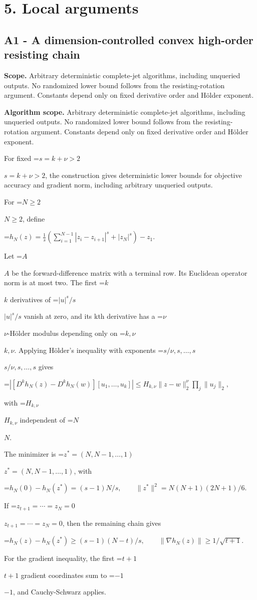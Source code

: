\documentclass[10pt,a4paper]{article}
\newcommand{\AtlasMath}[1]{\par\begingroup\centering\setbox0=\hbox{$\displaystyle #1$}\ifdim\wd0>1.4\linewidth\typeout{ATLAS WIDE FORMULA: \the\wd0}\fi\ifdim\wd0>\linewidth\resizebox{\linewidth}{!}{\box0}\else\box0\fi\par\endgroup}
\newcommand{\AtlasInlineMath}[1]{\begingroup\setbox0=\hbox{$#1$}\ifdim\wd0>.4\linewidth\endgroup\AtlasMath{#1}\else\endgroup$#1$\fi}
\begin{document}
\section{5. Local arguments}
\subsection{A1 - A dimension-controlled convex high-order resisting chain}
\textbf{Scope.} Arbitrary deterministic complete-jet algorithms, including unqueried outputs. No randomized lower bound follows from the resisting-rotation argument. Constants depend only on fixed derivative order and Hölder exponent.

\textbf{Algorithm scope.} Arbitrary deterministic complete-jet algorithms, including unqueried outputs. No randomized lower bound follows from the resisting-rotation argument. Constants depend only on fixed derivative order and Hölder exponent.

For fixed \AtlasInlineMath{s=k+\nu>2}, the construction gives deterministic lower bounds for objective accuracy and gradient norm, including arbitrary unqueried outputs.

For \AtlasInlineMath{N\ge2}, define

\AtlasMath{h_N(z)=\frac1s\left(\sum_{i=1}^{N-1}|z_i-z_{i+1}|^s+|z_N|^s\right)-z_1.}

Let \AtlasInlineMath{A} be the forward-difference matrix with a terminal row. Its Euclidean operator norm is at most two. The first \AtlasInlineMath{k} derivatives of \AtlasInlineMath{|u|^s/s} vanish at zero, and its kth derivative has a \AtlasInlineMath{\nu}-Hölder modulus depending only on \AtlasInlineMath{k,\nu}. Applying Hölder's inequality with exponents \AtlasInlineMath{s/\nu,s,\ldots,s} gives

\AtlasMath{|[D^kh_N(z)-D^kh_N(w)][u_1,\ldots,u_k]|
\le H_{k,\nu}\|z-w\|_2^\nu\prod_j\|u_j\|_2,}

with \AtlasInlineMath{H_{k,\nu}} independent of \AtlasInlineMath{N}.

The minimizer is \AtlasInlineMath{z^*=(N,N-1,\ldots,1)}, with

\AtlasMath{h_N(0)-h_N(z^*)=(s-1)N/s,\qquad
\|z^*\|^2=N(N+1)(2N+1)/6.}

If \AtlasInlineMath{z_{t+1}=\cdots=z_N=0}, then the remaining chain gives

\AtlasMath{h_N(z)-h_N(z^*)\ge(s-1)(N-t)/s,\qquad
\|\nabla h_N(z)\|\ge1/\sqrt{t+1}.}

For the gradient inequality, the first \AtlasInlineMath{t+1} gradient coordinates sum to \AtlasInlineMath{-1}, and Cauchy-Schwarz applies.
\end{document}
